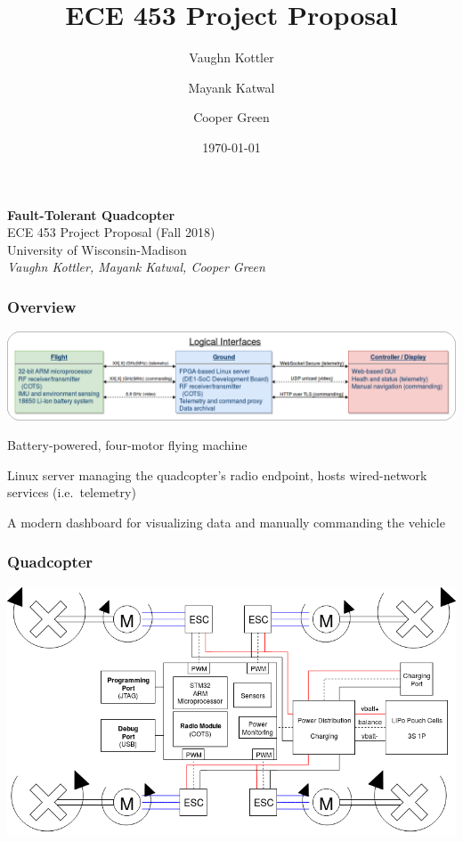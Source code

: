 \documentclass{beamer}
\title{ECE 453 Project Proposal}
\author{Vaughn Kottler}
\author{Mayank Katwal}
\author{Cooper Green}
\date{\today}
\begin{document}
\begin{frame}
\begin{center}
{\Large\textbf{Fault-Tolerant Quadcopter}}\\
\vspace{\baselineskip}
ECE 453 Project Proposal (Fall 2018)\\
University of Wisconsin-Madison\\
\vspace{\baselineskip}
{\large\textit{Vaughn Kottler, Mayank Katwal, Cooper Green}}
\end{center}
\end{frame}

\begin{frame}
\frametitle{Overview}
\begin{center}
\includegraphics[width=\linewidth]{../src/im/top_level}
\end{center}
\vspace{\baselineskip}
\begin{description}[align=right,labelwidth=80pt,itemsep=10pt]
\item [Quadcopter] Battery-powered, four-motor flying machine
\item [Ground Station] Linux server managing the quadcopter's
	radio endpoint, hosts wired-network services (i.e.\ telemetry)
\item [Web-based UI] A modern dashboard for visualizing data
	and manually commanding the vehicle
\end{description}
\end{frame}

\begin{frame}
\frametitle{Quadcopter}
\begin{center}
\includegraphics[width=\linewidth]{../src/im/quadcopter}
\end{center}
\end{frame}
\end{document}
